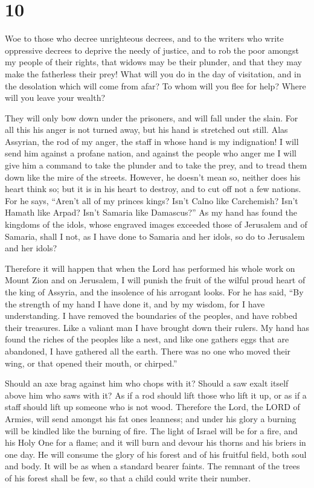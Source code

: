\hypertarget{section-9}{%
\section{10}\label{section-9}}

 Woe to those who decree unrighteous decrees, and to the
writers who write oppressive decrees  to deprive the needy
of justice, and to rob the poor amongst my people of their rights, that
widows may be their plunder, and that they may make the fatherless their
prey!  What will you do in the day of visitation, and in the
desolation which will come from afar? To whom will you flee for help?
Where will you leave your wealth?

 They will only bow down under the prisoners, and will fall
under the slain. For all this his anger is not turned away, but his hand
is stretched out still.  Alas Assyrian, the rod of my anger,
the staff in whose hand is my indignation!  I will send him
against a profane nation, and against the people who anger me I will
give him a command to take the plunder and to take the prey, and to
tread them down like the mire of the streets.  However, he
doesn't mean so, neither does his heart think so; but it is in his heart
to destroy, and to cut off not a few nations.  For he says,
``Aren't all of my princes kings?  Isn't Calno like
Carchemish? Isn't Hamath like Arpad? Isn't Samaria like Damascus?''
 As my hand has found the kingdoms of the idols, whose
engraved images exceeded those of Jerusalem and of Samaria,
 shall I not, as I have done to Samaria and her idols, so
do to Jerusalem and her idols?

 Therefore it will happen that when the Lord has performed
his whole work on Mount Zion and on Jerusalem, I will punish the fruit
of the wilful proud heart of the king of Assyria, and the insolence of
his arrogant looks.  For he has said, ``By the strength of
my hand I have done it, and by my wisdom, for I have understanding. I
have removed the boundaries of the peoples, and have robbed their
treasures. Like a valiant man I have brought down their rulers.
 My hand has found the riches of the peoples like a nest,
and like one gathers eggs that are abandoned, I have gathered all the
earth. There was no one who moved their wing, or that opened their
mouth, or chirped.''

 Should an axe brag against him who chops with it? Should a
saw exalt itself above him who saws with it? As if a rod should lift
those who lift it up, or as if a staff should lift up someone who is not
wood.  Therefore the Lord, the LORD of Armies, will send
amongst his fat ones leanness; and under his glory a burning will be
kindled like the burning of fire.  The light of Israel will
be for a fire, and his Holy One for a flame; and it will burn and devour
his thorns and his briers in one day.  He will consume the
glory of his forest and of his fruitful field, both soul and body. It
will be as when a standard bearer faints.  The remnant of
the trees of his forest shall be few, so that a child could write their
number.

